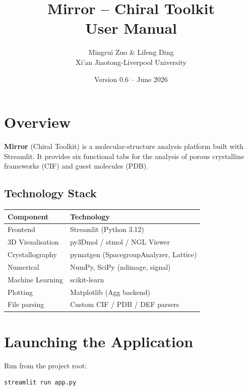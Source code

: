 \documentclass[11pt,a4paper]{article}
\title{\textbf{Mirror -- Chiral Toolkit}\\User Manual}
\author{Mingrui Zuo \& Lifeng Ding\\Xi'an Jiaotong-Liverpool University}
\date{Version 0.6 -- June 2026}
\begin{document}
\maketitle
\tableofcontents
\newpage

\section{Overview}

\textbf{Mirror} (Chiral Toolkit) is a molecular-structure analysis platform
built with Streamlit.  It provides six functional tabs for the analysis of
porous crystalline frameworks (CIF) and guest molecules (PDB).

\subsection{Technology Stack}

\begin{tabular}{ll}
    \toprule
    Component & Technology \\
    \midrule
    Frontend & Streamlit (Python 3.12) \\
    3D Visualisation & py3Dmol / stmol / NGL Viewer \\
    Crystallography & pymatgen (SpacegroupAnalyzer, Lattice) \\
    Numerical & NumPy, SciPy (ndimage, signal) \\
    Machine Learning & scikit-learn \\
    Plotting & Matplotlib (Agg backend) \\
    File parsing & Custom CIF / PDB / DEF parsers \\
    \bottomrule
\end{tabular}

\section{Launching the Application}

Run from the project root:

\begin{lstlisting}[language=bash]
streamlit run app.py
\end{lstlisting}
\end{document}
